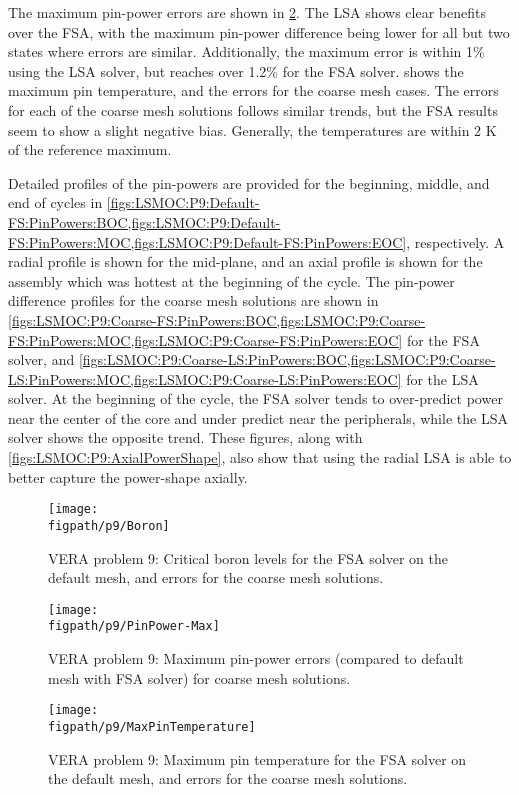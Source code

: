 {{{      The maximum pin-power errors are shown in \cref{fig:LSMOC:P9:Max Pin Power Errors}.
      The \ac{LSA} shows clear benefits over the \ac{FSA}, with the maximum pin-power difference being lower for all but two states where errors are similar.
      Additionally, the maximum error is within 1\% using the \ac{LSA} solver, but reaches over 1.2\% for the \ac{FSA} solver.
       shows the maximum pin temperature, and the errors for the coarse mesh cases.
      The errors for each of the coarse mesh solutions follows similar trends, but the \ac{FSA} results seem to show a slight negative bias.
      Generally, the temperatures are within 2 K of the reference maximum.

      Detailed profiles of the pin-powers are provided for the beginning, middle, and end of cycles in \cref{figs:LSMOC:P9:Default-FS:PinPowers:BOC,figs:LSMOC:P9:Default-FS:PinPowers:MOC,figs:LSMOC:P9:Default-FS:PinPowers:EOC}, respectively.
      A radial profile is shown for the mid-plane, and an axial profile is shown for the assembly which was hottest at the beginning of the cycle.
      The pin-power difference profiles for the coarse mesh solutions are shown in \cref{figs:LSMOC:P9:Coarse-FS:PinPowers:BOC,figs:LSMOC:P9:Coarse-FS:PinPowers:MOC,figs:LSMOC:P9:Coarse-FS:PinPowers:EOC} for the \ac{FSA} solver, and \cref{figs:LSMOC:P9:Coarse-LS:PinPowers:BOC,figs:LSMOC:P9:Coarse-LS:PinPowers:MOC,figs:LSMOC:P9:Coarse-LS:PinPowers:EOC} for the \ac{LSA} solver.
      At the beginning of the cycle, the \ac{FSA} solver tends to over-predict power near the center of the core and under predict near the peripherals, while the \ac{LSA} solver shows the opposite trend.
      These figures, along with \cref{figs:LSMOC:P9:AxialPowerShape}, also show that using the radial \ac{LSA} is able to better capture the power-shape axially.

      \begin{figure}[htbp]
        \centering
        \texttt{[image: \\figpath/p9/Boron]}
        \caption{VERA problem 9: Critical boron levels for the FSA solver on the default mesh, and errors for the coarse mesh solutions. \label{fig:LSMOC:P9:Boron}}
      \end{figure}
      \begin{figure}[htbp]
        \centering
        \texttt{[image: \\figpath/p9/PinPower-Max]}
        \caption{VERA problem 9: Maximum pin-power errors (compared to default mesh with FSA solver) for coarse mesh solutions. \label{fig:LSMOC:P9:Max Pin Power Errors}}
      \end{figure}
      \begin{figure}[htbp]
        \centering
        \texttt{[image: \\figpath/p9/MaxPinTemperature]}
        \caption{VERA problem 9: Maximum pin temperature for the FSA solver on the default mesh, and errors for the coarse mesh solutions. \label{fig:LSMOC:P9:Max Pin Temperature}}
      \end{figure}

}}}
